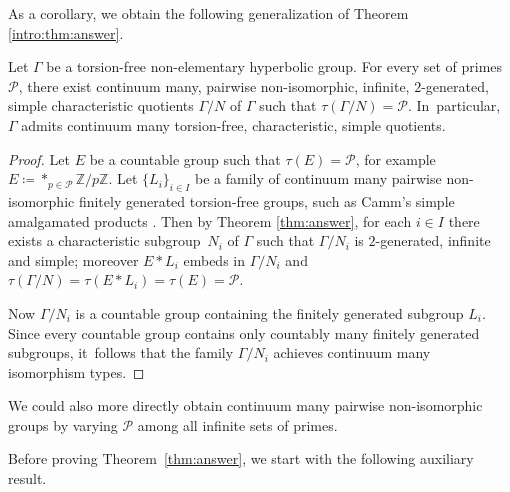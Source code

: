 As a corollary, we obtain the following generalization of Theorem \ref{intro:thm:answer}.

\begin{corollary}
\label{cor:answer}
Let $\Gamma$ be a torsion-free non-elementary hyperbolic group. For every set of primes $\mathcal{P}$, there exist continuum many, pairwise non-isomorphic, infinite, $2$\nobreakdash-generated, simple characteristic quotients $\Gamma/N$ of $\Gamma$ such that $\tau(\Gamma/N) = \mathcal{P}$. In~particular, $\Gamma$ admits continuum many torsion-free, characteristic, simple quotients.
\end{corollary}

\begin{proof}
Let $E$ be a countable group such that $\tau(E) \!=\! \mathcal{P}$, for example \hbox{$E \!\coloneqq\! \ast_{p \in \mathcal{P}} \mathbb{Z}/p\mathbb{Z}$}.
Let $\{ L_i \}_{i \in I}$ be a family of continuum many pairwise non-isomorphic finitely generated torsion-free groups, such as Camm's simple amalgamated products \cite{camm}.
Then by Theorem \ref{thm:answer}, for each $i \in I$ there exists a characteristic subgroup~$N_i$ of $\Gamma$ such that $\Gamma / N_i$ is $2$-generated, infinite and simple; moreover $E \ast L_i$ embeds in $\Gamma / N_i$ and $\tau(\Gamma / N) = \tau(E \ast L_i) = \tau(E) = \mathcal{P}$.

Now $\Gamma / N_i$ is a countable group containing the finitely generated subgroup $L_i$.
Since every countable group contains only countably many finitely generated subgroups, it~follows that the family $\Gamma / N_i$ achieves continuum many isomorphism types.
\end{proof}

\begin{remark}
We could also more directly obtain continuum many pairwise non-isomorphic groups by varying $\mathcal{P}$ among all infinite sets of primes.
\end{remark}

Before proving Theorem~\ref{thm:answer}, we start with the following auxiliary result.

